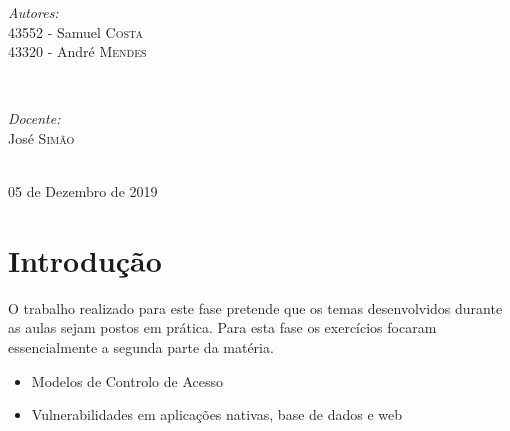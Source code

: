 \documentclass[11pt]{report}
\begin{document}
\begin{titlepage}
\vskip 70pt
\begin{minipage}{0.4\textwidth}
\begin{flushleft} \large
\emph{Autores:}\\
43552 - Samuel \textsc{Costa}\\
43320 - André \textsc{Mendes}
\end{flushleft}
\end{minipage}
~
\begin{minipage}{0.4\textwidth}
\begin{flushright} \large
\emph{Docente:} \\
José \textsc{Simão}\\
\end{flushright}
\end{minipage}\\[3cm]


{\large 05 de Dezembro de 2019}\\[3cm] %


\vfill %

\end{titlepage}


\renewcommand\thesection{\arabic{section}}

\tableofcontents


\newpage


\section*{Introdução}
O trabalho realizado para este fase pretende que os temas desenvolvidos durante as aulas sejam postos em prática. Para esta fase os exercícios focaram essencialmente a segunda parte da matéria.\\

\begin{itemize}
  \item Modelos de Controlo de Acesso
  \item Vulnerabilidades em aplicações nativas, base de dados e web
\end{itemize}
\end{document}
